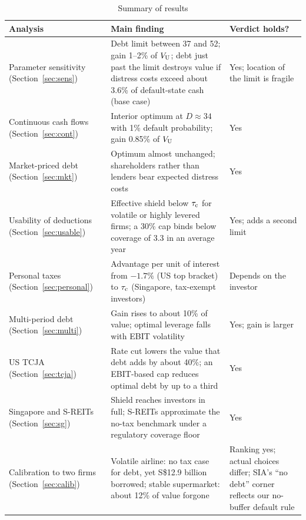 \begin{table}[htbp]\centering\footnotesize
\caption{Summary of results}\label{tab:summary}
\begin{tabularx}{\linewidth}{@{}>{\raggedright\arraybackslash\hsize=0.64\hsize}X
                                >{\raggedright\arraybackslash\hsize=1.54\hsize}X
                                >{\centering\arraybackslash\hsize=0.82\hsize}X@{}}
\toprule
Analysis & Main finding & Verdict holds? \\
\midrule
Parameter sensitivity (Section~\ref{sec:sens}) & Debt limit between 37 and 52; gain 1--2\% of $V_{\mathrm{U}}$; debt just past the limit destroys value if distress costs exceed about 3.6\% of default-state cash (base case) & Yes; location of the limit is fragile \\
\addlinespace[1.5pt]
Continuous cash flows (Section~\ref{sec:cont}) & Interior optimum at $D \approx 34$ with 1\% default probability; gain 0.85\% of $V_{\mathrm{U}}$ & Yes \\
\addlinespace[1.5pt]
Market-priced debt (Section~\ref{sec:mkt}) & Optimum almost unchanged; shareholders rather than lenders bear expected distress costs & Yes \\
\addlinespace[1.5pt]
Usability of deductions (Section~\ref{sec:usable}) & Effective shield below $\tau_{\mathrm{c}}$ for volatile or highly levered firms; a 30\% cap binds below coverage of 3.3 in an average year & Yes; adds a second limit \\
\addlinespace[1.5pt]
Personal taxes (Section~\ref{sec:personal}) & Advantage per unit of interest from $-1.7\%$ (US top bracket) to $\tau_{\mathrm{c}}$ (Singapore, tax-exempt investors) & Depends on the investor \\
\addlinespace[1.5pt]
Multi-period debt (Section~\ref{sec:multi}) & Gain rises to about 10\% of value; optimal leverage falls with EBIT volatility & Yes; gain is larger \\
\addlinespace[1.5pt]
US TCJA (Section~\ref{sec:tcja}) & Rate cut lowers the value that debt adds by about 40\%; an EBIT-based cap reduces optimal debt by up to a third & Yes \\
\addlinespace[1.5pt]
Singapore and S-REITs (Section~\ref{sec:sg}) & Shield reaches investors in full; S-REITs approximate the no-tax benchmark under a regulatory coverage floor & Yes \\
\addlinespace[1.5pt]
Calibration to two firms (Section~\ref{sec:calib}) & Volatile airline: no tax case for debt, yet S\$12.9 billion borrowed; stable supermarket: about 12\% of value forgone & Ranking yes; actual choices differ; SIA's ``no debt'' corner reflects our no-buffer default rule \\
\bottomrule
\end{tabularx}
\end{table}
